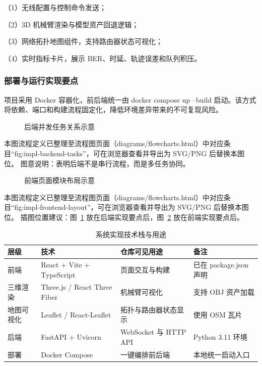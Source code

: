 （1）无线配置与控制命令发送；

（2）3D 机械臂渲染与模型资产回退逻辑；

（3）网络拓扑地图组件，支持路由器状态可视化；

（4）实时指标卡片，展示 BER、时延、轨迹误差和队列积压。

\subsubsection{部署与运行实现要点}
项目采用 Docker 容器化，前后端统一由 docker compose up --build 启动\cite{docker_compose_docs}。该方式将依赖、端口和构建流程固定化，降低环境差异带来的不可复现风险。

\begin{figure}[htbp]
\centering
{}
\caption{后端并发任务关系示意}
\label{fig:impl-backend-tasks}
\end{figure}

\noindent 本图流程定义已整理至流程图页面（diagrams/flowcharts.html）中对应条目“fig:impl-backend-tasks”，可在浏览器查看并导出为 SVG/PNG 后替换本图位。
\noindent 图意说明：表明后端不是串行流程，而是多任务协同。

\begin{figure}[htbp]
\centering
{}
\caption{前端页面模块布局示意}
\label{fig:impl-frontend-layout}
\end{figure}

\noindent 本图流程定义已整理至流程图页面（diagrams/flowcharts.html）中对应条目“fig:impl-frontend-layout”，可在浏览器查看并导出为 SVG/PNG 后替换本图位。
\noindent 插图位置建议：图~\ref{fig:impl-backend-tasks} 放在后端实现要点后，图~\ref{fig:impl-frontend-layout} 放在前端实现要点后。

\begin{table}[htbp]
\centering
\caption{系统实现技术栈与用途}
\label{tab:impl-stack}
\begin{tabular}{llll}
\hline
层级 & 技术 & 仓库可见用途 & 备注 \\
\hline
前端 & React + Vite + TypeScript & 页面交互与构建 & 已在 package.json 声明 \\
三维渲染 & Three.js / React Three Fiber & 机械臂可视化 & 支持 OBJ 资产加载 \\
地图可视化 & Leaflet / React-Leaflet & 拓扑与路由器状态显示 & 使用 OSM 瓦片 \\
后端 & FastAPI + Uvicorn & WebSocket 与 HTTP API & Python 3.11 环境 \\
部署 & Docker Compose & 一键编排前后端 & 本地统一启动入口 \\
\hline
\end{tabular}
\end{table}

